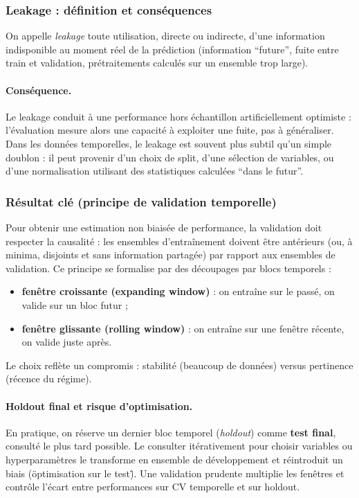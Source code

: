 \documentclass[11pt,a4paper]{article}
\newcommand{\1}{\mathbf{1}}
\begin{document}
\subsubsection{Leakage : d\'efinition et cons\'equences}
On appelle \emph{leakage} toute utilisation, directe ou indirecte, d'une information indisponible au moment r\'eel de la pr\'ediction
(information ``future'', fuite entre train et validation, pr\'etraitements calcul\'es sur un ensemble trop large).

\paragraph{Cons\'equence.}
Le leakage conduit \`a une performance hors \'echantillon artificiellement optimiste : l'\'evaluation mesure alors une capacit\'e \`a exploiter une fuite,
pas \`a g\'en\'eraliser. Dans les donn\'ees temporelles, le leakage est souvent plus subtil qu'un simple doublon : il peut provenir d'un choix de split,
d'une s\'election de variables, ou d'une normalisation utilisant des statistiques calcul\'ees ``dans le futur''.

\subsubsection{R\'esultat cl\'e (principe de validation temporelle)}
Pour obtenir une estimation non biais\'ee de performance, la validation doit respecter la causalit\'e : les ensembles d'entra\^{i}nement doivent \^etre
ant\'erieurs (ou, \`a minima, disjoints et sans information partag\'ee) par rapport aux ensembles de validation. Ce principe se formalise par des d\'ecoupages
par blocs temporels :
\begin{itemize}
  \item \textbf{fen\^etre croissante (expanding window)} : on entra\^{i}ne sur le pass\'e, on valide sur un bloc futur ;
  \item \textbf{fen\^etre glissante (rolling window)} : on entra\^{i}ne sur une fen\^etre r\'ecente, on valide juste apr\`es.
\end{itemize}
Le choix refl\`ete un compromis : stabilit\'e (beaucoup de donn\'ees) versus pertinence (r\'ecence du r\'egime).

\paragraph{Holdout final et risque d'optimisation.}
En pratique, on r\'eserve un dernier bloc temporel (\emph{holdout}) comme \textbf{test final}, consult\'e le plus tard possible.
Le consulter it\'erativement pour choisir variables ou hyperparam\`etres le transforme en ensemble de d\'eveloppement et r\'eintroduit un biais
(\"optimisation sur le test\"). Une validation prudente multiplie les fen\^etres et contr\^ole l'\'ecart entre performances sur CV temporelle et sur holdout.
\end{document}

